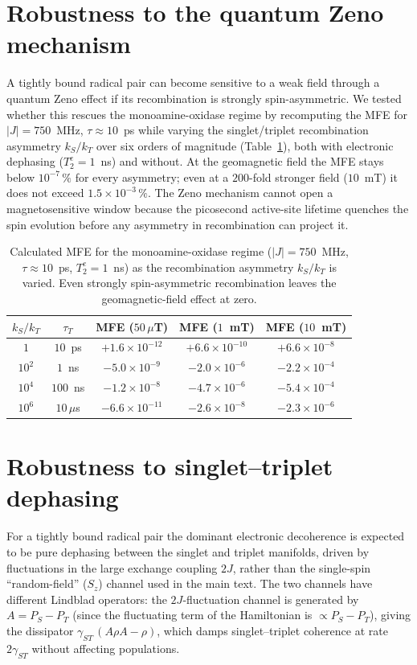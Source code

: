 \documentclass[11pt]{article}
\begin{document}
\section{Robustness to the quantum Zeno mechanism}

A tightly bound radical pair can become sensitive to a weak field through a
quantum Zeno effect if its recombination is strongly spin-asymmetric. We tested
whether this rescues the monoamine-oxidase regime by recomputing the MFE for
$|J| = 750$~MHz, $\tau\approx10$~ps while varying the singlet/triplet
recombination asymmetry $k_S/k_T$ over six orders of magnitude
(Table~\ref{tab:zeno}), both with electronic dephasing ($T_2^e = 1$~ns) and
without. At the geomagnetic field the MFE stays below $10^{-7}\,\%$ for every asymmetry; even
at a $200$-fold stronger field ($10$~mT) it does not exceed
$1.5\times10^{-3}\,\%$. The Zeno mechanism cannot open a magnetosensitive window
because the picosecond active-site lifetime quenches the spin evolution before
any asymmetry in recombination can project it.

\begin{table}[h]
\centering
\caption{Calculated MFE for the monoamine-oxidase regime ($|J| = 750$~MHz,
$\tau\approx10$~ps, $T_2^e = 1$~ns) as the recombination asymmetry $k_S/k_T$ is
varied. Even strongly spin-asymmetric recombination leaves the geomagnetic-field
effect at zero.}
\label{tab:zeno}
\begin{tabular}{c c c c c}
\toprule
$k_S/k_T$ & $\tau_T$ & MFE ($50\,\mu$T) & MFE ($1$~mT) & MFE ($10$~mT) \\
\midrule
$1$       & $10$~ps    & $+1.6\times10^{-12}$ & $+6.6\times10^{-10}$ & $+6.6\times10^{-8}$ \\
$10^{2}$  & $1$~ns     & $-5.0\times10^{-9}$  & $-2.0\times10^{-6}$  & $-2.2\times10^{-4}$ \\
$10^{4}$  & $100$~ns   & $-1.2\times10^{-8}$  & $-4.7\times10^{-6}$  & $-5.4\times10^{-4}$ \\
$10^{6}$  & $10\,\mu$s & $-6.6\times10^{-11}$ & $-2.6\times10^{-8}$  & $-2.3\times10^{-6}$ \\
\bottomrule
\end{tabular}
\end{table}

\section{Robustness to singlet--triplet dephasing}

For a tightly bound radical pair the dominant electronic decoherence is expected
to be pure dephasing between the singlet and triplet manifolds, driven by
fluctuations in the large exchange coupling $2J$, rather than the single-spin
``random-field'' ($S_z$) channel used in the main text. The two channels have
different Lindblad operators: the $2J$-fluctuation channel is generated by
$A = P_S - P_T$ (since the fluctuating term of the Hamiltonian is
$\propto P_S - P_T$), giving the dissipator
$\gamma_{ST}\,(A\rho A - \rho)$, which damps singlet--triplet coherence at rate
$2\gamma_{ST}$ without affecting populations.
\end{document}
